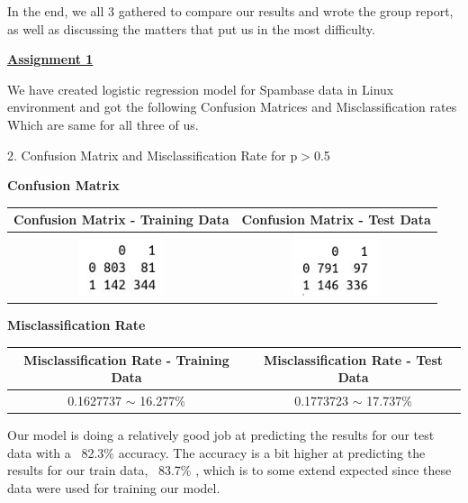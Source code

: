 \documentclass[a4paper,10pt]{article}
\begin{document}
In the end, we all 3 gathered to compare our results and wrote the group report, as well as discussing the matters that put us in the most difficulty. \par
\vspace{0.5cm}
\textbf{\underline{Assignment 1}} \par
We have created logistic regression model for Spambase data in Linux environment and got the following 
Confusion Matrices and Misclassification rates Which are same for all three of us. \par
2. Confusion Matrix and Misclassification Rate for p$>$0.5 \par
\begin{center}
	\textbf{Confusion Matrix} \par
	\begin{tabular}{|c|c|}
		\hline
		Confusion Matrix - Training Data&
		Confusion Matrix - Test Data\\
		\hline
		\cellcolor{yellow!100} \includegraphics[width=25mm,scale=0.10]{Confusion_Matrix_training_Data_1.png} &
		\cellcolor{yellow!100} \includegraphics[width=25mm,scale=0.10]{Confusion_Matrix_test_Data_1.png}\\
		\hline
\end{tabular}\par \par
	\textbf{Misclassification Rate} \par
	\begin{tabular}{|c|c|}
		\hline
		Misclassification Rate - Training Data&
		Misclassification Rate - Test Data\\
		\hline
		\cellcolor{yellow!100} 0.1627737 $\sim$ 16.277\% & \cellcolor{yellow!100} 0.1773723 $\sim$ 17.737\%\\
		\hline
	\end{tabular}\par
\end{center} \par
Our model is doing a relatively good job at predicting the results for our test data with a ~82.3\% accuracy. The accuracy is a bit higher at predicting the results for our train data, ~83.7\% , which is to some extend expected since these data were used for training our model.\par
\end{document}
